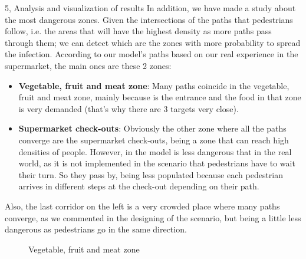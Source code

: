 \begin{task}{5, Analysis and visualization of results}
In addition, we have made a study about the most dangerous zones. Given the intersections of the paths that pedestrians follow, i.e. the areas that will have the highest density as more paths pass through them; we can detect which are the zones with more probability to spread the infection. According to our model's paths based on our real experience in the supermarket, the main ones are these 2 zones:
\begin{itemize}
    \item \textbf{Vegetable, fruit and meat zone}: Many paths coincide in the vegetable, fruit and meat zone, mainly because is the entrance and the food in that zone is very demanded (that's why there are 3 targets very close).
    \item \textbf{Supermarket check-outs}: Obviously the other zone where all the paths converge are the supermarket check-outs, being a zone that can reach high densities of people. However, in the model is less dangerous that in the real world, as it is not implemented in the scenario that pedestrians have to wait their turn. So they pass by, being less populated because each pedestrian arrives in different steps at the check-out depending on their path.
    
\end{itemize}
Also, the last corridor on the left is a very crowded place where many paths converge, as we commented in the designing of the scenario, but being a little less dangerous as pedestrians go in the same direction.

\begin{figure}[H]
\centering
{}
\caption{Vegetable, fruit and meat zone}
\label{infectvege}
\end{figure}



\end{task}
